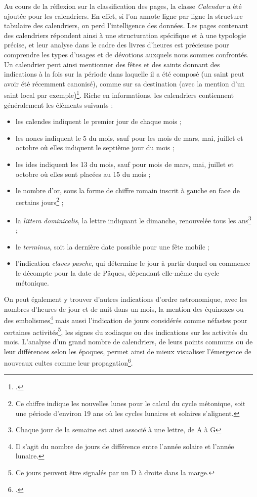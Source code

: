 \documentclass[a4paper,12pt,twoside]{book}
\begin{document}
    Au cours de la réflexion sur la classification des pages, la classe \textit{Calendar} a été ajoutée pour les calendriers. En effet, si l’on annote ligne par ligne la structure tabulaire des calendriers, on perd l’intelligence des données. Les pages contenant des calendriers répondent ainsi à une structuration spécifique et à une typologie précise, et leur analyse dans le cadre des livres d'heures est précieuse pour comprendre les types d'usages et de dévotions auxquels nous sommes confrontés. Un calendrier peut ainsi mentionner des fêtes et des saints donnant des indications à la fois sur la période dans laquelle il a été composé (un saint peut avoir été récemment canonisé), comme sur sa destination (avec la mention d'un saint local par exemple)\footcite[p. 767]{analyse_calendrier}. Riche en informations, les calendriers contiennent généralement les éléments suivants : 
    \begin{itemize}
        \item les calendes indiquent le premier jour de chaque mois ;
        \item les nones indiquent le 5 du mois, sauf pour les mois de mars, mai, juillet et octobre où elles indiquent le septième jour du mois ;
        \item les ides indiquent les 13 du mois, sauf pour mois de mars, mai, juillet et octobre où elles sont placées au 15 du mois ;
        \item le nombre d'or, sous la forme de chiffre romain inscrit à gauche en face de certains jours\footnote{Ce chiffre indique les nouvelles lunes pour le calcul du cycle métonique, soit une période d'environ 19 ans où les cycles lunaires et solaires s'alignent.} ;
        \item la \textit{littera dominicalis}, la lettre indiquant le dimanche, renouvelée tous les ans\footnote{Chaque jour de la semaine est ainsi associé à une lettre, de A à G} ;
        \item le \textit{terminus}, soit la dernière date possible pour une fête mobile ;
        \item l'indication \textit{claves pasche}, qui détermine le jour à partir duquel on commence le décompte pour la date de Pâques, dépendant elle-même du cycle métonique.
    \end{itemize}
    
    On peut également y trouver d'autres indications d'ordre astronomique, avec les nombres d'heures de jour et de nuit dans un mois, la mention des équinoxes ou des embolismes\footnote{Il s'agit du nombre de jours de différence entre l'année solaire et l'année lunaire.} mais aussi l'indication de jours considérés comme néfastes pour certaines activités\footnote{Ce jours peuvent être signalés par un \og D\fg{} à droite dans la marge.}, les signes du zodiaque ou des indications sur les activités du mois. L'analyse d'un grand nombre de calendriers, de leurs points communs ou de leur différences selon les époques, permet ainsi de mieux visualiser l'émergence de nouveaux cultes comme leur propagation\footcite[p. 768]{analyse_calendrier}. \\
    
\end{document}
